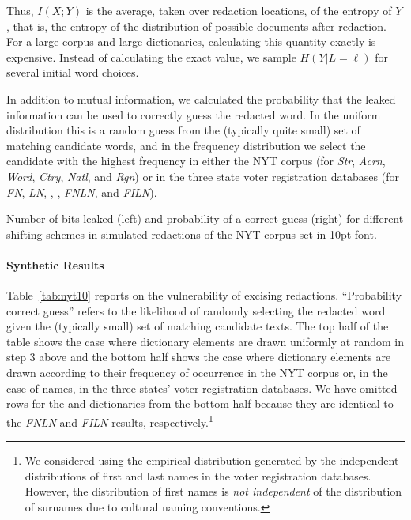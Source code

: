 Thus, $I(X;Y)$ is the average, taken over redaction locations, of the entropy of $Y$, that is, the entropy of the distribution of possible documents after redaction. 
For a large corpus and large dictionaries, calculating this quantity exactly is expensive. 
Instead of calculating the exact value, we sample $H(Y|L=\ell)$ for several initial word choices.

In addition to mutual information, we calculated the probability that the leaked information can be used to correctly guess the redacted word.
In the uniform distribution this is a random guess from the (typically quite small) set of matching candidate words, and in the frequency distribution we select the candidate with the highest frequency in either the NYT corpus (for \emph{Str}, \emph{Acrn}, \emph{Word}, \emph{Ctry}, \emph{Natl}, and \emph{Rgn}) or in the three state voter registration databases (for \emph{FN}, \emph{LN}, \emph{\fnxlnname}, \emph{\fixlnname}, \emph{FNLN}, and \emph{FILN}).

\begin{table}
\centering\footnotesize
\caption{Number of bits leaked (left) and probability of a correct guess (right) for different shifting schemes in simulated redactions of the NYT corpus set in 10pt font.
    }
\label{tab:nyt10}

\end{table}

\paragraph{Synthetic Results}
Table~\ref{tab:nyt10} reports on the vulnerability of excising redactions.
``Probability correct guess'' refers to the likelihood of randomly selecting the redacted word given the (typically small) set of matching candidate texts.
The top half of the table shows the case where dictionary elements are drawn uniformly at random in step 3 above and the bottom half shows the case where dictionary elements are drawn according to their frequency of occurrence in the NYT corpus or, in the case of names, in the three states' voter registration databases. 
We have omitted rows for the \emph{\fnxlnname} and \emph{\fixlnname} dictionaries from the bottom half because they are identical to the \emph{FNLN} and \emph{FILN} results, respectively.\footnote{
We considered using the empirical distribution generated by the independent distributions of first and last names in the voter registration databases.
However, the distribution of first names is \emph{not independent} of the distribution of surnames due to cultural naming conventions. 
}


